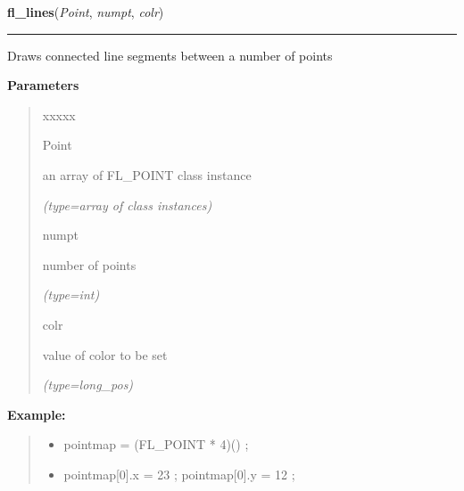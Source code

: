     \label{xformslib:flxbasic:fl_lines}

    \vspace{0.5ex}

\hspace{.8\funcindent}\begin{boxedminipage}{\funcwidth}

    \raggedright \textbf{fl\_lines}(\textit{Point}, \textit{numpt}, \textit{colr})

    \vspace{-1.5ex}

    \rule{\textwidth}{0.5\fboxrule}
\setlength{\parskip}{2ex}
    Draws connected line segments between a number of points

\setlength{\parskip}{1ex}
      \textbf{Parameters}
      \vspace{-1ex}

      \begin{quote}
        \begin{Ventry}{xxxxx}

          \item[Point]

          an array of FL\_POINT class instance

            {\it (type=array of class instances)}

          \item[numpt]

          number of points

            {\it (type=int)}

          \item[colr]

          value of color to be set

            {\it (type=long\_pos)}

        \end{Ventry}

      \end{quote}

\textbf{Example:}
\begin{quote}
  \begin{itemize}

  \item
    \setlength{\parskip}{0.6ex}
pointmap = (FL\_POINT * 4)() ;



  \item pointmap[0].x = 23 ; pointmap[0].y = 12 ;




\end{itemize}
\end{quote}
\end{boxedminipage}
